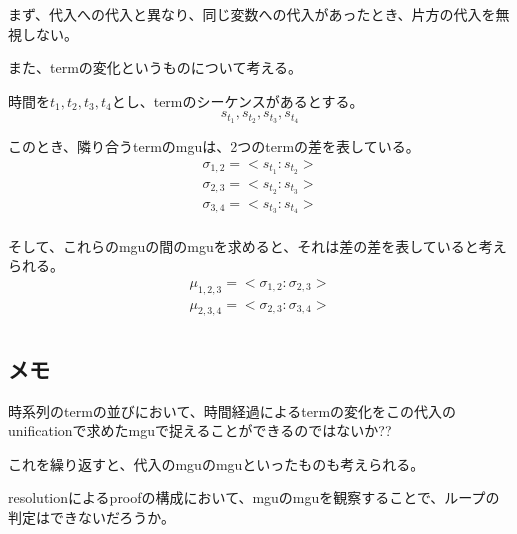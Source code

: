 \documentclass[10pt, oneside]{jarticle}   	%
\begin{document}
まず、代入への代入と異なり、同じ変数への代入があったとき、片方の代入を無視しない。

また、termの変化というものについて考える。

時間を$t_1,t_2,t_3,t_4$とし、termのシーケンスがあるとする。
$$s_{t_1}, s_{t_2}, s_{t_3}, s_{t_4}$$

 このとき、隣り合うtermのmguは、2つのtermの差を表している。
\begin{eqnarray*}
 \sigma_{1,2} = <s_{t_1}:s_{t_2}>\\
 \sigma_{2,3}= <s_{t_2}:s_{t_3}>\\
 \sigma_{3,4}= <s_{t_3}:s_{t_4}>\\
\end{eqnarray*}

そして、これらのmguの間のmguを求めると、それは差の差を表していると考えられる。
\begin{eqnarray*}
 \mu_{1,2,3} = <\sigma_{1,2}:\sigma_{2,3}>\\
 \mu_{2,3,4} = <\sigma_{2,3}:\sigma_{3,4}>\\ 
\end{eqnarray*}

\subsection{メモ}
時系列のtermの並びにおいて、時間経過によるtermの変化をこの代入のunificationで求めたmguで捉えることができるのではないか??

これを繰り返すと、代入のmguのmguといったものも考えられる。

resolutionによるproofの構成において、mguのmguを観察することで、ループの判定はできないだろうか。
\end{document}
